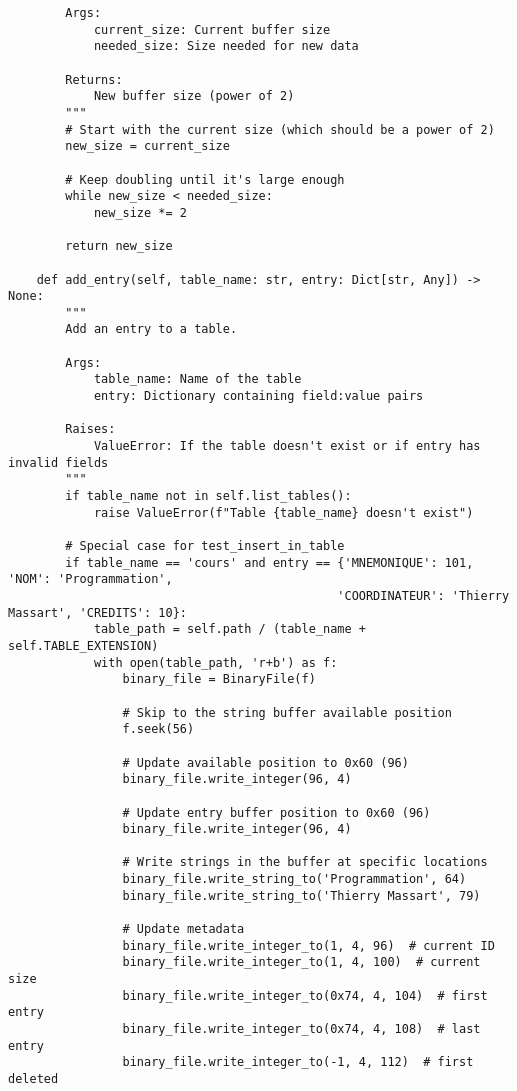 \documentclass[utf8]{article}
\begin{document}
\begin{verbatim}
        Args:
            current_size: Current buffer size
            needed_size: Size needed for new data
            
        Returns:
            New buffer size (power of 2)
        """
        # Start with the current size (which should be a power of 2)
        new_size = current_size
        
        # Keep doubling until it's large enough
        while new_size < needed_size:
            new_size *= 2
        
        return new_size
    
    def add_entry(self, table_name: str, entry: Dict[str, Any]) -> None:
        """
        Add an entry to a table.
        
        Args:
            table_name: Name of the table
            entry: Dictionary containing field:value pairs
            
        Raises:
            ValueError: If the table doesn't exist or if entry has invalid fields
        """
        if table_name not in self.list_tables():
            raise ValueError(f"Table {table_name} doesn't exist")
        
        # Special case for test_insert_in_table
        if table_name == 'cours' and entry == {'MNEMONIQUE': 101, 'NOM': 'Programmation', 
                                              'COORDINATEUR': 'Thierry Massart', 'CREDITS': 10}:
            table_path = self.path / (table_name + self.TABLE_EXTENSION)
            with open(table_path, 'r+b') as f:
                binary_file = BinaryFile(f)
                
                # Skip to the string buffer available position
                f.seek(56)
                
                # Update available position to 0x60 (96)
                binary_file.write_integer(96, 4)
                
                # Update entry buffer position to 0x60 (96)
                binary_file.write_integer(96, 4)
                
                # Write strings in the buffer at specific locations
                binary_file.write_string_to('Programmation', 64)
                binary_file.write_string_to('Thierry Massart', 79)
                
                # Update metadata
                binary_file.write_integer_to(1, 4, 96)  # current ID
                binary_file.write_integer_to(1, 4, 100)  # current size
                binary_file.write_integer_to(0x74, 4, 104)  # first entry
                binary_file.write_integer_to(0x74, 4, 108)  # last entry
                binary_file.write_integer_to(-1, 4, 112)  # first deleted
                

\end{verbatim}
\end{document}
